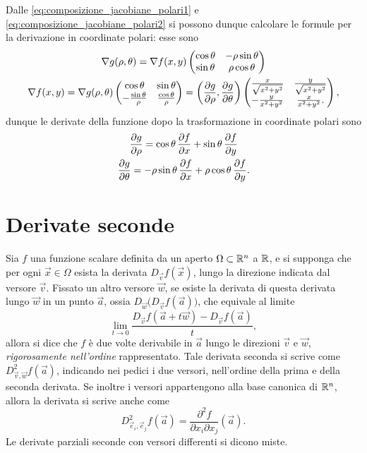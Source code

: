\begin{esempio}
	Dalle \eqref{eq:composizione_jacobiane_polari1} e \eqref{eq:composizione_jacobiane_polari2} si possono dunque calcolare le formule per la derivazione in coordinate polari: esse sono
	\begin{equation} \label{eq:jacobiane_polari}
	\begin{gathered}
	\nabla g(\rho,\theta)
	=\nabla f(x,y)
		\begin{pmatrix}
		\cos\theta	&-\rho\sin\theta\\
		\sin\theta	&\rho\cos\theta
		\end{pmatrix}\\
	\nabla f(x,y)
	=\nabla g(\rho,\theta)
		\begin{pmatrix}
		\cos\theta			&\sin\theta\\
		-\frac{\sin\theta}{\rho}	&\frac{\cos\theta}{\rho}
		\end{pmatrix}
	=\bigg(\frac{\partial {g}}{\partial {\rho}},\frac{\partial {g}}{\partial {\theta}}\bigg)
		\begin{pmatrix}
		\frac{x}{\sqrt{x^2+y^2}}	&\frac{y}{\sqrt{x^2+y^2}}\\
		-\frac{y}{x^2+y^2}		&\frac{x}{x^2+y^2}.
		\end{pmatrix},
	\end{gathered}
	\end{equation}
	dunque le derivate della funzione dopo la trasformazione in coordinate polari sono
	\begin{equation} \label{eq:derivate_polari}
	\begin{gathered}
	\frac{\partial {g}}{\partial {\rho}}=\cos\theta\,\frac{\partial {f}}{\partial {x}}+\sin\theta\,\frac{\partial {f}}{\partial {y}}\\
	\frac{\partial {g}}{\partial {\theta}}=-\rho\sin\theta\,\frac{\partial {f}}{\partial {x}}+\rho\cos\theta\,\frac{\partial {f}}{\partial {y}}.
	\end{gathered}
	\end{equation}
\end{esempio}

\section{Derivate seconde}
Sia $f$ una funzione scalare definita da un aperto $\Omega\subset\mathbb{R}^n$ a $\mathbb{R}$, e si supponga che per ogni $\vec x\in\Omega$ esista la derivata $D_{\vec v}f(\vec x)$, lungo la direzione indicata dal versore $\vec v$. Fissato un altro versore $\vec w$, se esiste la derivata di questa derivata lungo $\vec w$ in un punto $\vec a$, ossia $D_{\vec w}\big(D_{\vec v}f(\vec a)\big)$, che equivale al limite
\[
\lim_{t\to 0}\frac{D_{\vec v}f(\vec a+t\vec w)-D_{\vec v}f(\vec a)}{t},
\]
allora si dice che $f$ è due volte derivabile in $\vec a$ lungo le direzioni $\vec v$ e $\vec w$, \emph{rigorosamente nell'ordine} rappresentato. Tale derivata seconda si scrive come $D^2_{\vec v,\vec w}f(\vec a)$, indicando nei pedici i due versori, nell'ordine della prima e della seconda derivata.
Se inoltre i versori appartengono alla base canonica di $\mathbb{R}^n$, allora la derivata si scrive anche come
\[
D^2_{\vec e_i,\vec e_j}f(\vec a)=\frac{\partial^2f}{\partial x_i\partial x_j}(\vec a).
\]
Le derivate parziali seconde con versori differenti si dicono miste.

